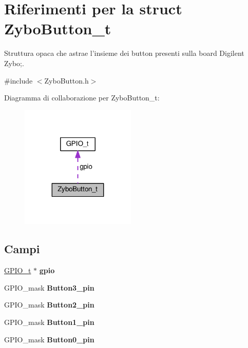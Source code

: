 \hypertarget{struct_zybo_button__t}{\section{Riferimenti per la struct Zybo\+Button\+\_\+t}
\label{struct_zybo_button__t}
}


Struttura opaca che astrae l'insieme dei button presenti sulla board Digilent Zybo;.  




{\ttfamily \#include $<$Zybo\+Button.\+h$>$}



Diagramma di collaborazione per Zybo\+Button\+\_\+t\+:
\nopagebreak
\begin{figure}[H]
\begin{center}
\leavevmode
\includegraphics[width=155pt]{struct_zybo_button__t__coll__graph}
\end{center}
\end{figure}
\subsection*{Campi}
\begin{DoxyCompactItemize}
\item 
\hypertarget{struct_zybo_button__t_acb3116190992a4d8d26545c103304d27}{\hyperlink{struct_g_p_i_o__t}{G\+P\+I\+O\+\_\+t} $\ast$ {\bfseries gpio}}\label{struct_zybo_button__t_acb3116190992a4d8d26545c103304d27}

\item 
\hypertarget{struct_zybo_button__t_a0be2104e3b0077272dcbfee7dbdb14ee}{G\+P\+I\+O\+\_\+mask {\bfseries Button3\+\_\+pin}}\label{struct_zybo_button__t_a0be2104e3b0077272dcbfee7dbdb14ee}

\item 
\hypertarget{struct_zybo_button__t_a249726210aba837b00df4d2afc89965d}{G\+P\+I\+O\+\_\+mask {\bfseries Button2\+\_\+pin}}\label{struct_zybo_button__t_a249726210aba837b00df4d2afc89965d}

\item 
\hypertarget{struct_zybo_button__t_aa4b6f01d89a502266798176affa8f59b}{G\+P\+I\+O\+\_\+mask {\bfseries Button1\+\_\+pin}}\label{struct_zybo_button__t_aa4b6f01d89a502266798176affa8f59b}

\item 
\hypertarget{struct_zybo_button__t_aa079dc844a7d73e98b762cef39e9bf90}{G\+P\+I\+O\+\_\+mask {\bfseries Button0\+\_\+pin}}\label{struct_zybo_button__t_aa079dc844a7d73e98b762cef39e9bf90}

\end{DoxyCompactItemize}


